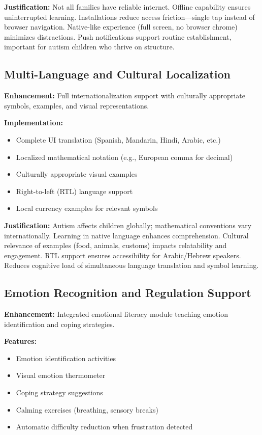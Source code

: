 \documentclass[11pt, a4paper]{article}
\begin{document}
\textbf{Justification:} Not all families have reliable internet. Offline capability ensures uninterrupted learning. Installations reduce access friction—single tap instead of browser navigation. Native-like experience (full screen, no browser chrome) minimizes distractions. Push notifications support routine establishment, important for autism children who thrive on structure.

\subsection{Multi-Language and Cultural Localization}

\textbf{Enhancement:} Full internationalization support with culturally appropriate symbols, examples, and visual representations.

\textbf{Implementation:}
\begin{itemize}[leftmargin=*, noitemsep]
    \item Complete UI translation (Spanish, Mandarin, Hindi, Arabic, etc.)
    \item Localized mathematical notation (e.g., European comma for decimal)
    \item Culturally appropriate visual examples
    \item Right-to-left (RTL) language support
    \item Local currency examples for relevant symbols
\end{itemize}

\textbf{Justification:} Autism affects children globally; mathematical conventions vary internationally. Learning in native language enhances comprehension. Cultural relevance of examples (food, animals, customs) impacts relatability and engagement. RTL support ensures accessibility for Arabic/Hebrew speakers. Reduces cognitive load of simultaneous language translation and symbol learning.

\subsection{Emotion Recognition and Regulation Support}

\textbf{Enhancement:} Integrated emotional literacy module teaching emotion identification and coping strategies.

\textbf{Features:}
\begin{itemize}[leftmargin=*, noitemsep]
    \item Emotion identification activities
    \item Visual emotion thermometer
    \item Coping strategy suggestions
    \item Calming exercises (breathing, sensory breaks)
    \item Automatic difficulty reduction when frustration detected
\end{itemize}
\end{document}
